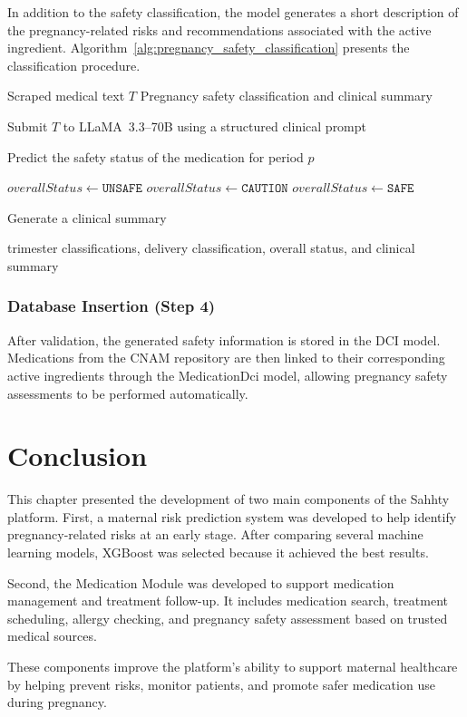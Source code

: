 In addition to the safety classification, the model generates a short description of the pregnancy-related risks and recommendations associated with the active ingredient. Algorithm~\ref{alg:pregnancy_safety_classification} presents the classification procedure.
\begin{algorithm}[H]
\caption{AI-Based Pregnancy Safety Classification}
\label{alg:pregnancy_safety_classification}

\begin{algorithmic}[1]

\Require Scraped medical text $T$
\Ensure Pregnancy safety classification and clinical summary

\State Submit $T$ to LLaMA~3.3--70B using a structured clinical prompt

    \State Predict the safety status of the medication for period $p$
\EndFor

    \State $overallStatus \gets \texttt{UNSAFE}$
    \State $overallStatus \gets \texttt{CAUTION}$
\Else
    \State $overallStatus \gets \texttt{SAFE}$
\EndIf

\State Generate a clinical summary

\State \Return trimester classifications, delivery classification, overall status, and clinical summary

\end{algorithmic}
\end{algorithm}
\subsubsection{Database Insertion (Step 4)}

After validation, the generated safety information is stored in the DCI model. Medications from the CNAM repository are then linked to their corresponding active ingredients through the MedicationDci model, allowing pregnancy safety assessments to be performed automatically.

\section{Conclusion}

This chapter presented the development of two main components of the Sahhty platform. First, a maternal risk prediction system was developed to help identify pregnancy-related risks at an early stage. After comparing several machine learning models, XGBoost was selected because it achieved the best results.

Second, the Medication Module was developed to support medication management and treatment follow-up. It includes medication search, treatment scheduling, allergy checking, and pregnancy safety assessment based on trusted medical sources.

These components improve the platform's ability to support maternal healthcare by helping prevent risks, monitor patients, and promote safer medication use during pregnancy.